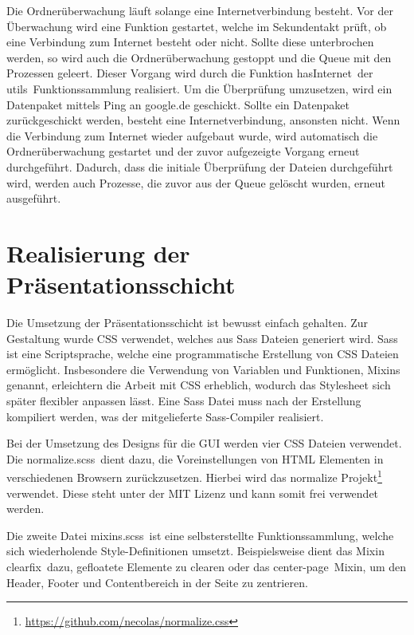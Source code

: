 Die Ordnerüberwachung läuft solange eine Internetverbindung besteht.
Vor der Überwachung wird eine Funktion gestartet, welche im Sekundentakt prüft, ob eine Verbindung zum Internet besteht oder nicht.
Sollte diese unterbrochen werden, so wird auch die Ordnerüberwachung gestoppt und die Queue mit den Prozessen geleert.
Dieser Vorgang wird durch die Funktion \frqq hasInternet\flqq\ der \frqq utils\flqq\ Funktionssammlung realisiert.
Um die Überprüfung umzusetzen, wird ein Datenpaket mittels Ping an google.de geschickt.
Sollte ein Datenpaket zurückgeschickt werden, besteht eine Internetverbindung, ansonsten nicht.
Wenn die Verbindung zum Internet wieder aufgebaut wurde, wird automatisch die Ordnerüberwachung gestartet und der zuvor aufgezeigte Vorgang erneut durchgeführt.
Dadurch, dass die initiale Überprüfung der Dateien durchgeführt wird, werden auch Prozesse, die zuvor aus der Queue gelöscht wurden, erneut ausgeführt.

\section{Realisierung der Präsentationsschicht}
Die Umsetzung der Präsentationsschicht ist bewusst einfach gehalten.
Zur Gestaltung wurde \ac{CSS} verwendet, welches aus \ac{Sass} Dateien generiert wird.
\ac{Sass} ist eine Scriptsprache, welche eine programmatische Erstellung von \ac{CSS} Dateien ermöglicht.
Insbesondere die Verwendung von Variablen und Funktionen, Mixins genannt, erleichtern die Arbeit mit \ac{CSS} erheblich, wodurch das Stylesheet sich später flexibler anpassen lässt.
Eine \ac{Sass} Datei muss nach der Erstellung kompiliert werden, was der mitgelieferte \ac{Sass}-Compiler realisiert.

Bei der Umsetzung des Designs für die \ac{GUI} werden vier \ac{CSS} Dateien verwendet.
Die \frqq normalize.scss\flqq\ dient dazu, die Voreinstellungen von \ac{HTML} Elementen in verschiedenen Browsern zurückzusetzen.
Hierbei wird das normalize Projekt\footnote{\url{https://github.com/necolas/normalize.css}} verwendet.
Diese steht unter der MIT Lizenz und kann somit frei verwendet werden.

Die zweite Datei \frqq mixins.scss\flqq\ ist eine selbsterstellte Funktionssammlung, welche sich wiederholende Style-Definitionen umsetzt.
Beispielsweise dient das Mixin \frqq clearfix\flqq\ dazu, gefloatete Elemente zu clearen oder das \frqq center-page\flqq\ Mixin, um den Header, Footer und Contentbereich in der Seite zu zentrieren.

